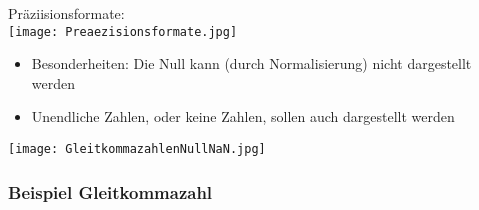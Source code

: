 			\vspace{0.3cm}
			\begin{center}
				Präziisionsformate: \\
				\texttt{[image: Preaezisionsformate.jpg]}
			\end{center}


			\vspace{0.5cm}
			\begin{itemize}
				\item Besonderheiten: Die Null kann (durch Normalisierung) nicht dargestellt werden
				\item Unendliche Zahlen, oder keine Zahlen, sollen auch dargestellt werden
			\end{itemize}
			\centerline{\texttt{[image: GleitkommazahlenNullNaN.jpg]}}


		\subsubsection{Beispiel Gleitkommazahl}
